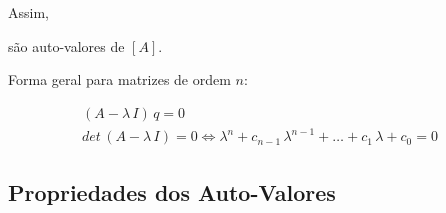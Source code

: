 Assim,




são auto-valores de $ [A] $.

Forma geral para matrizes de ordem $ n $:

\[
 \begin{array}{l}
  (A - \lambda \, I) \, q = 0\\
  det \, (A - \lambda \, I) = 0 \Leftrightarrow \lambda ^n + c_{n-1} \, \lambda^{n-1} + \ldots + c_1 \, \lambda + c_0 = 0
 \end{array}
\]

\subsection{Propriedades dos Auto-Valores}

